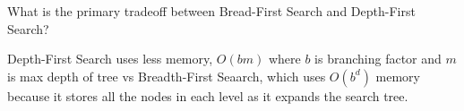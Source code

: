 \begin{questions}
\question What is the primary tradeoff between Bread-First Search and Depth-First Search?

\begin{solution}[1in]
Depth-First Search uses less memory, $O(bm)$ where $b$ is branching factor and $m$ is max depth of tree vs Breadth-First Seaarch, which uses $O(b^d)$ memory because it stores all the nodes in each level as it expands the search tree.
\end{solution}

\end{questions}


